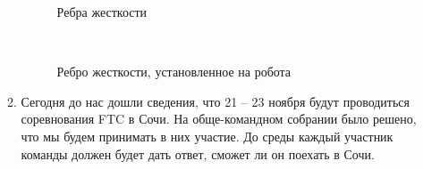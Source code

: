 \begin{enumerate}
\begin{enumerate}
      \begin{figure}[H]
      	\begin{minipage}[h]{0.47\linewidth}
      		\caption{Ребра жесткости}  
      	\end{minipage}
      	\hfill
      	\begin{minipage}[h]{0.47\linewidth}
      		\caption{Ребро жесткости, установленное на робота}
      	\end{minipage}
      \end{figure}
      
      \item Сегодня до нас дошли сведения, что 21 – 23 ноября будут проводиться соревнования FTC в Сочи. На обще-командном собрании было решено, что мы будем принимать в них участие. До среды каждый участник команды должен будет дать ответ, сможет ли он поехать в Сочи.
      

\end{enumerate}
\end{enumerate}
